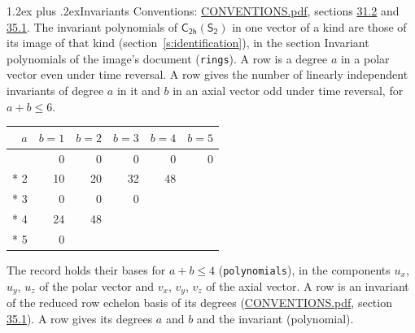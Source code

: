 \documentclass[10pt,a4paper]{article}
\makeatletter
\renewcommand\section{\@startsection{section}{1}{\z@}{-3ex plus -1ex minus -.2ex}%
  {1.2ex plus .2ex}{\normalfont\large\sffamily\bfseries\color{parttitle}}}
\numberwithin{equation}{section}
\newcommand{\grp}[1]{\mathsf{#1}}
\makeatother
\begin{document}
\section{Invariants}\label{s:invariants}
Conventions: \href{../../CONVENTIONS.pdf}{CONVENTIONS.pdf}, sections \href{../../CONVENTIONS.pdf\#conv.31.2}{31.2} and \href{../../CONVENTIONS.pdf\#conv.35.1}{35.1}.
The invariant polynomials of $\grp{C_{2h}}(\grp{S_{2}})$ in one vector of a kind are those of its image of that kind (section~\ref{s:identification}), in the section Invariant polynomials of the image's document (\texttt{rings}).
\leavevmode\label{n:index.degree.polar}\label{n:index.degree.axial}A row is a degree $a$ in a polar vector even under time reversal. A row gives the number of linearly independent invariants of degree $a$ in it and $b$ in an axial vector odd under time reversal, for $a + b \le 6$.
{\small\begin{longtable}{@{}rrrrrr@{}}\toprule
$a$ & $b = 1$ & $b = 2$ & $b = 3$ & $b = 4$ & $b = 5$\\\midrule\endhead
\bottomrule\endfoot\endlastfoot
1 & 0 & 0 & 0 & 0 & 0\\*
2 & 10 & 20 & 32 & 48 & \\*
3 & 0 & 0 & 0 &  & \\*
4 & 24 & 48 &  &  & \\*
5 & 0 &  &  &  & \\
\bottomrule\end{longtable}}
\leavevmode\label{n:local.component.polar}\label{n:local.component.axial}The record holds their bases for $a + b \le 4$ (\texttt{polynomials}), in the components $u_{x}$, $u_{y}$, $u_{z}$ of the polar vector and $v_{x}$, $v_{y}$, $v_{z}$ of the axial vector. \label{n:head.polynomial}A row is an invariant of the reduced row echelon basis of its degrees (\href{../../CONVENTIONS.pdf}{CONVENTIONS.pdf}, section \href{../../CONVENTIONS.pdf\#conv.35.1}{35.1}). A row gives its degrees $a$ and $b$ and the invariant (polynomial).
\end{document}
